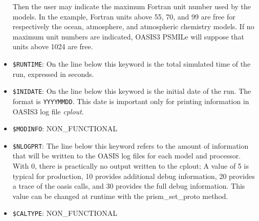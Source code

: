 \begin{itemize}
Then the user may
indicate the maximum Fortran unit number used by the models. In  the
example, Fortran units above 55, 70, and 99 are free for respectively
the ocean, atmosphere, and atmospheric chemistry models. If no
maximum unit numbers are indicated, OASIS3 PSMILe will suppose that units
above 1024 are free. 

\item {\tt \$RUNTIME}: On the line below this keyword is the total
simulated time of the run, expressed in seconds. 

\item {\tt \$INIDATE}: On the line below this keyword is the initial
  date of the run. The format is {\tt YYYYMMDD}. This date is important only
  for printing information in OASIS3 log file {\it cplout}.

\item {\tt \$MODINFO}: NON\_FUNCTIONAL
 
\item {\tt \$NLOGPRT}: The line below this keyword refers to the
  amount of information that will be written to the OASIS log files
  for each model and processor.  With 0, there is practically no output
  written to the cplout; A value of 5 is typical for production, 10
  provides additional debug information, 20 provides a trace of the
  oasis calls, and 30 provides the full debug information.  This
  value can be changed at runtime with the prism\_set\_proto method.

\item {\tt \$CALTYPE}: NON\_FUNCTIONAL

\end{itemize}

